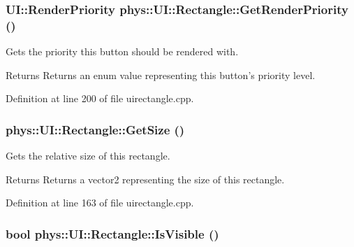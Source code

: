 \hypertarget{classphys_1_1UI_1_1Rectangle_a8445b7d0dcb2c92f29aeadac305af420}{
\subsubsection[{GetRenderPriority}]{\setlength{\rightskip}{0pt plus 5cm}UI::RenderPriority phys::UI::Rectangle::GetRenderPriority ()}}
\label{d1/d5d/classphys_1_1UI_1_1Rectangle_a8445b7d0dcb2c92f29aeadac305af420}


Gets the priority this button should be rendered with. 

\begin{DoxyReturn}{Returns}
Returns an enum value representing this button's priority level. 
\end{DoxyReturn}


Definition at line 200 of file uirectangle.cpp.

\hypertarget{classphys_1_1UI_1_1Rectangle_a5f54debc5c435cda9505b40ce82f4f24}{
\subsubsection[{GetSize}]{ phys::UI::Rectangle::GetSize ()}}
\label{d1/d5d/classphys_1_1UI_1_1Rectangle_a5f54debc5c435cda9505b40ce82f4f24}


Gets the relative size of this rectangle. 

\begin{DoxyReturn}{Returns}
Returns a vector2 representing the size of this rectangle. 
\end{DoxyReturn}


Definition at line 163 of file uirectangle.cpp.

\hypertarget{classphys_1_1UI_1_1Rectangle_aad47a2d9a7c9d8d9111b2edbf44541d5}{
\subsubsection[{IsVisible}]{\setlength{\rightskip}{0pt plus 5cm}bool phys::UI::Rectangle::IsVisible ()}}
\label{d1/d5d/classphys_1_1UI_1_1Rectangle_aad47a2d9a7c9d8d9111b2edbf44541d5}



